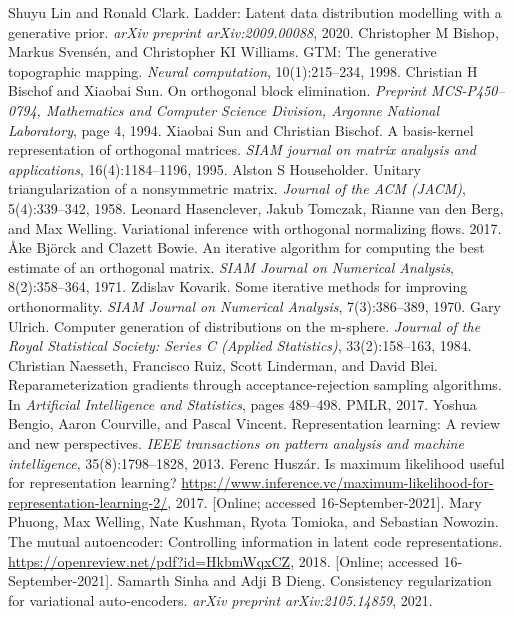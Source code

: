 \begin{chapterreferences}
 Shuyu Lin and Ronald Clark. Ladder: Latent data distribution modelling with a generative prior. \textit{arXiv preprint arXiv:2009.00088}, 2020.
 Christopher M Bishop, Markus Svensén, and Christopher KI Williams. GTM: The generative topographic mapping. \textit{Neural computation}, 10(1):215–234, 1998.
 Christian H Bischof and Xiaobai Sun. On orthogonal block elimination. \textit{Preprint MCS-P450–0794, Mathematics and Computer Science Division, Argonne National Laboratory}, page 4, 1994.
 Xiaobai Sun and Christian Bischof. A basis-kernel representation of orthogonal matrices. \textit{SIAM journal on matrix analysis and applications}, 16(4):1184–1196, 1995.
 Alston S Householder. Unitary triangularization of a nonsymmetric matrix. \textit{Journal of the ACM (JACM)}, 5(4):339–342, 1958.
 Leonard Hasenclever, Jakub Tomczak, Rianne van den Berg, and Max Welling. Variational inference with orthogonal normalizing flows. 2017.
 Åke Björck and Clazett Bowie. An iterative algorithm for computing the best estimate of an orthogonal matrix. \textit{SIAM Journal on Numerical Analysis}, 8(2):358–364, 1971.
 Zdislav Kovarik. Some iterative methods for improving orthonormality. \textit{SIAM Journal on Numerical Analysis}, 7(3):386–389, 1970.
 Gary Ulrich. Computer generation of distributions on the m-sphere. \textit{Journal of the Royal Statistical Society: Series C (Applied Statistics)}, 33(2):158–163, 1984.
 Christian Naesseth, Francisco Ruiz, Scott Linderman, and David Blei. Reparameterization gradients through acceptance-rejection sampling algorithms. In \textit{Artificial Intelligence and Statistics}, pages 489–498. PMLR, 2017.
 Yoshua Bengio, Aaron Courville, and Pascal Vincent. Representation learning: A review and new perspectives. \textit{IEEE transactions on pattern analysis and machine intelligence}, 35(8):1798–1828, 2013.
 Ferenc Huszár. Is maximum likelihood useful for representation learning? \url{https://www.inference.vc/maximum-likelihood-for-representation-learning-2/}, 2017. [Online; accessed 16-September-2021].
 Mary Phuong, Max Welling, Nate Kushman, Ryota Tomioka, and Sebastian Nowozin. The mutual autoencoder: Controlling information in latent code representations. \url{https://openreview.net/pdf?id=HkbmWqxCZ}, 2018. [Online; accessed 16-September-2021].
 Samarth Sinha and Adji B Dieng. Consistency regularization for variational auto-encoders. \textit{arXiv preprint arXiv:2105.14859}, 2021.

\end{chapterreferences}
